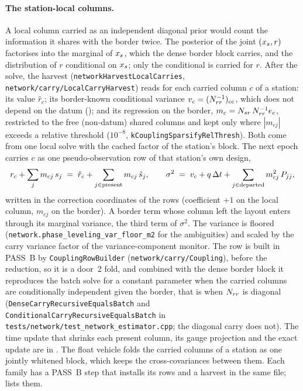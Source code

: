 \documentclass[main.tex]{subfiles}
\begin{document}
\paragraph{The station-local columns.}
A local column carried as an independent diagonal prior would count the
information it shares with the border twice.  The posterior of the
joint $(x_s, r)$ factorises into the marginal of $x_s$, which the
dense border block carries, and the distribution of $r$ conditional on
$x_s$; only the conditional is carried for $r$.  After the solve, the
harvest (\texttt{networkHarvestLocalCarries},
\texttt{network/carry/LocalCarryHarvest}) reads for each carried column
$c$ of a station: its value $\hat r_c$; its border-known conditional
variance $v_c = (N_{rr}^{-1})_{cc}$, which does not depend on the datum
(); and its regression
on the border, $m_c = N_{sr}\,N_{rr}^{-1}e_c$, restricted to the
free (non-datum) shared columns and kept only where
$|m_{cj}|$ exceeds a relative threshold ($10^{-8}$,
\texttt{kCouplingSparsifyRelThresh}).  Both come from one local solve
with the cached factor of the station's block.  The next epoch carries
$c$ as one pseudo-observation row of that station's own design,
\begin{equation}
r_c + \sum_{j} m_{cj}\,s_j \;=\;
   \hat r_c + \sum_{j\in\text{present}} m_{cj}\,\hat s_j,
\qquad
\sigma^2 \;=\; v_c + q\,\Delta t + \sum_{j\in\text{departed}} m_{cj}^2\,P_{jj},
\label{eq:carry-condrow}
\end{equation}
written in the correction coordinates of the rows (coefficient $+1$ on
the local column, $m_{cj}$ on the border).  A border term whose column
left the layout enters through its marginal variance, the third term of
$\sigma^2$.  The variance is floored (\texttt{network.phase\_leveling\_var\_floor\_m2}
for the ambiguities) and scaled by the carry variance factor of the
variance-component monitor.  The row is built in PASS~B by
\texttt{CouplingRowBuilder} (\texttt{network/carry/Coupling}), before the
reduction, so it is a door~2 fold, and combined with the dense border
block it reproduces the batch solve for a constant parameter when the
carried columns are conditionally independent given the border, that is
when $N_{rr}$ is diagonal (\texttt{DenseCarryRecursiveEqualsBatch} and
\texttt{ConditionalCarryRecursiveEqualsBatch} in
\texttt{tests/network/test\_network\_estimator.cpp}; the diagonal carry
does not).  The time update
that shrinks each present column, its gauge projection and the exact
update are in .  The float vehicle folds the carried columns of a station as
one jointly whitened block, which keeps the cross-covariances between
them.  Each family has a PASS~B step that installs its rows and a
harvest in the same file;  lists them.
\end{document}
